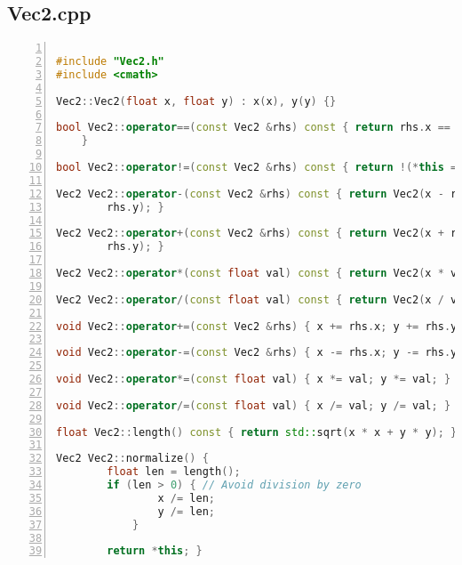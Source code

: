 \documentclass{report}
\begin{document}
\subsection*{Vec2.cpp}
\vspace{1em}
\begin{mdframed}[linecolor=black!30!white,linewidth=.5pt,extratopheight=1em]
    \begin{lstlisting}[language=C++, aboveskip=3mm,
    belowskip=3mm,
    showstringspaces=false,
    columns=flexible,
    basicstyle={\small\ttfamily},
    numbers=left,
    numberstyle=\tiny\color{gray},
    keywordstyle=\color{blue},
    commentstyle=\color{dkgreen},
    stringstyle=\color{mauve},
    breaklines=true,
    breakatwhitespace=true,
    tabsize=3,
    xleftmargin=1em]

#include "Vec2.h"
#include <cmath>

Vec2::Vec2(float x, float y) : x(x), y(y) {}

bool Vec2::operator==(const Vec2 &rhs) const { return rhs.x == x && rhs.y == y;
    }

bool Vec2::operator!=(const Vec2 &rhs) const { return !(*this == rhs); }

Vec2 Vec2::operator-(const Vec2 &rhs) const { return Vec2(x - rhs.x, y -
        rhs.y); }

Vec2 Vec2::operator+(const Vec2 &rhs) const { return Vec2(x + rhs.x, y +
        rhs.y); }

Vec2 Vec2::operator*(const float val) const { return Vec2(x * val, y * val); }

Vec2 Vec2::operator/(const float val) const { return Vec2(x / val, y / val); }

void Vec2::operator+=(const Vec2 &rhs) { x += rhs.x; y += rhs.y; }

void Vec2::operator-=(const Vec2 &rhs) { x -= rhs.x; y -= rhs.y; }

void Vec2::operator*=(const float val) { x *= val; y *= val; }

void Vec2::operator/=(const float val) { x /= val; y /= val; }

float Vec2::length() const { return std::sqrt(x * x + y * y); }

Vec2 Vec2::normalize() {
        float len = length();
        if (len > 0) { // Avoid division by zero
                x /= len;
                y /= len;
            }

        return *this; }

\end{lstlisting}
\end{mdframed}
\end{document}
